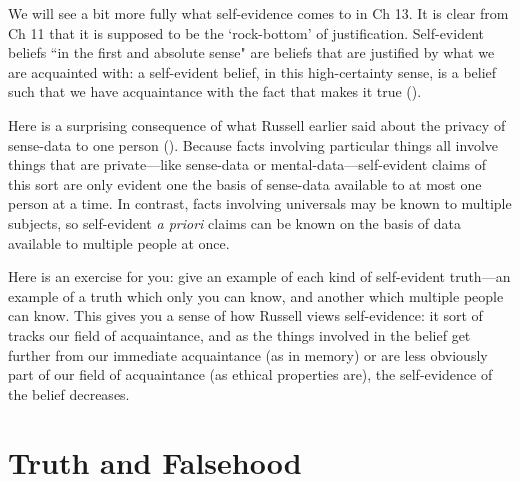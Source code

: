 \documentclass[oneside,letterpaper,12pt]{book}
\begin{document}
We will see a bit more fully what self-evidence comes to in Ch 13. It is clear from Ch 11 that it is supposed to be the `rock-bottom' of justification. Self-evident beliefs ``in the first and absolute sense" are beliefs that are justified by what we are acquainted with: a self-evident belief, in this high-certainty sense, is a belief such that we have acquaintance with the fact that makes it true (\pageref{selfevident}).

Here is a surprising consequence of what Russell earlier said about the privacy of sense-data to one person (\pageref{private}). Because facts involving particular things all involve things that are private---like sense-data or mental-data---self-evident claims of this sort are only evident one the basis of sense-data available to at most one person at a time. In contrast, facts involving universals may be known to multiple subjects, so self-evident \emph{a priori} claims can be known on the basis of data available to multiple people at once.

Here is an exercise for you: give an example of each kind of self-evident truth---an example of a truth which only you can know, and another which multiple people can know. This gives you a sense of how Russell views self-evidence: it sort of tracks our field of acquaintance, and as the things involved in the belief get further from our immediate acquaintance (as in memory) or are less obviously part of our field of acquaintance (as ethical properties are), the self-evidence of the belief decreases.

\hypertarget{chapter-xii.-truth-and-falsehood}{%
\chapter{Truth and Falsehood}\label{chapter-xii.-truth-and-falsehood}}
\end{document}

